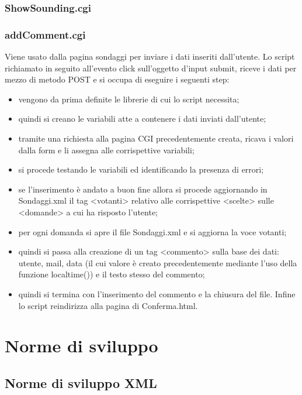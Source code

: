 \documentclass[10pt,a4paper,onecolumn]{article}
\begin{document}
\subsubsection{ShowSounding.cgi}

\subsubsection{addComment.cgi}
Viene usato dalla pagina sondaggi per inviare i dati inseriti dall'utente. Lo script richiamato in seguito all'evento click sull'oggetto d'input submit, riceve i dati per mezzo di metodo POST e si occupa di eseguire i seguenti step:
\begin{itemize}
  \item vengono da prima definite le librerie di cui lo script necessita;
  \item quindi si creano le variabili atte a contenere i dati inviati dall'utente;
  \item tramite una richiesta alla pagina CGI precedentemente creata, ricava i valori dalla form e li assegna alle corrispettive variabili;
  \item si procede testando le variabili ed identificando la presenza di errori;
  \item se l'inserimento è andato a buon fine allora si procede aggiornando in Sondaggi.xml il tag <votanti> relativo alle corrispettive <scelte> sulle <domande> a cui ha risposto l'utente;
  \item per ogni domanda si apre il file Sondaggi.xml e si aggiorna la voce votanti;
  \item quindi si passa alla creazione di un tag <commento> sulla base dei dati: utente, mail, data (il cui valore è creato precedentemente mediante l'uso della funzione localtime()) e il testo stesso del commento;
  \item quindi si termina con l'inserimento del commento e la chiusura del file. Infine lo script reindirizza alla pagina di Conferma.html.
\end{itemize}

\clearpage

\section{Norme di sviluppo}

\subsection{Norme di sviluppo XML}
\end{document}
